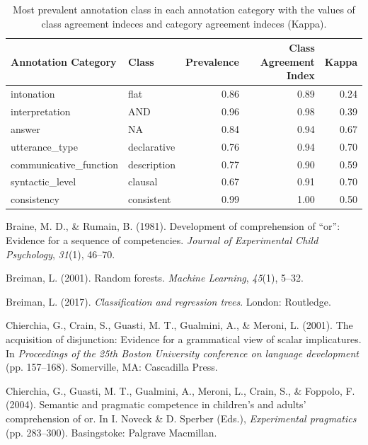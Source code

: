 \documentclass[,man,floatsintext]{apa6}
\begin{document}
\begin{table}[t]

\caption{\label{tab:andAgreeStats}Most prevalent annotation class in each annotation category with the values of class agreement indeces and category agreement indeces (Kappa).}
\centering
\begin{tabular}{l|l|r|r|r}
\hline
Annotation Category & Class & Prevalence & Class Agreement Index & Kappa\\
\hline
intonation & flat & 0.86 & 0.89 & 0.24\\
\hline
interpretation & AND & 0.96 & 0.98 & 0.39\\
\hline
answer & NA & 0.84 & 0.94 & 0.67\\
\hline
utterance\_type & declarative & 0.76 & 0.94 & 0.70\\
\hline
communicative\_function & description & 0.77 & 0.90 & 0.59\\
\hline
syntactic\_level & clausal & 0.67 & 0.91 & 0.70\\
\hline
consistency & consistent & 0.99 & 1.00 & 0.50\\
\hline
\end{tabular}
\end{table}

\setlength{\parindent}{-0.5in}
\setlength{\leftskip}{0.5in}

\hypertarget{refs}{}
\leavevmode\hypertarget{ref-braine1981development}{}%
Braine, M. D., \& Rumain, B. (1981). Development of comprehension of ``or'': Evidence for a sequence of competencies. \emph{Journal of Experimental Child Psychology}, \emph{31}(1), 46--70.

\leavevmode\hypertarget{ref-breiman2001random}{}%
Breiman, L. (2001). Random forests. \emph{Machine Learning}, \emph{45}(1), 5--32.

\leavevmode\hypertarget{ref-breiman2017classification}{}%
Breiman, L. (2017). \emph{Classification and regression trees}. London: Routledge.

\leavevmode\hypertarget{ref-chierchia2001acquisition}{}%
Chierchia, G., Crain, S., Guasti, M. T., Gualmini, A., \& Meroni, L. (2001). The acquisition of disjunction: Evidence for a grammatical view of scalar implicatures. In \emph{Proceedings of the 25th Boston University conference on language development} (pp. 157--168). Somerville, MA: Cascadilla Press.

\leavevmode\hypertarget{ref-chierchia2004semantic}{}%
Chierchia, G., Guasti, M. T., Gualmini, A., Meroni, L., Crain, S., \& Foppolo, F. (2004). Semantic and pragmatic competence in children's and adults' comprehension of or. In I. Noveck \& D. Sperber (Eds.), \emph{Experimental pragmatics} (pp. 283--300). Basingstoke: Palgrave Macmillan.
\end{document}
